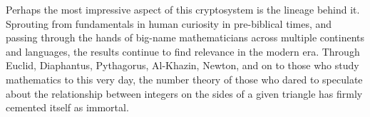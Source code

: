 \documentclass{article}
\begin{document}
Perhaps the most impressive aspect of this cryptosystem is the lineage behind it. Sprouting from fundamentals in human curiosity in pre-biblical times, and passing through the hands of big-name mathematicians across multiple continents and languages, the results continue to find relevance in the modern era. Through Euclid, Diaphantus, Pythagorus, Al-Khazin, Newton, and on to those who study mathematics to this very day, the number theory of those who dared to speculate about the relationship between integers on the sides of a given triangle has firmly cemented itself as immortal. 

\newpage


\end{document}
